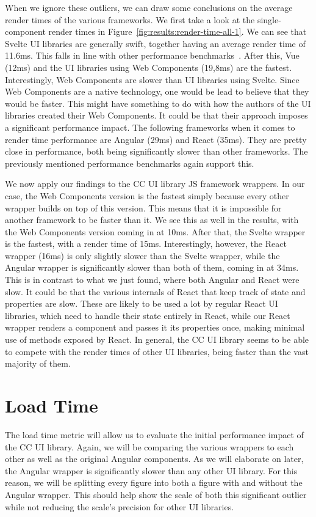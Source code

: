 When we ignore these outliers, we can draw some conclusions on the average render times of the various frameworks. We first take a look at the single-component render times in Figure~\ref{fig:results:render-time-all-1}. We can see that Svelte UI libraries are generally swift, together having an average render time of 11.6ms. This falls in line with other performance benchmarks~. After this, Vue (12ms) and the UI libraries using Web Components (19,8ms) are the fastest. Interestingly, Web Components are slower than UI libraries using Svelte. Since Web Components are a native technology, one would be lead to believe that they would be faster. This might have something to do with how the authors of the UI libraries created their Web Components. It could be that their approach imposes a significant performance impact. The following frameworks when it comes to render time performance are Angular (29ms) and React (35ms). They are pretty close in performance, both being significantly slower than other frameworks. The previously mentioned performance benchmarks again support this.

We now apply our findings to the CC UI library JS framework wrappers. In our case, the Web Components version is the fastest simply because every other wrapper builds on top of this version. This means that it is impossible for another framework to be faster than it. We see this as well in the results, with the Web Components version coming in at 10ms. After that, the Svelte wrapper is the fastest, with a render time of 15ms. Interestingly, however, the React wrapper (16ms) is only slightly slower than the Svelte wrapper, while the Angular wrapper is significantly slower than both of them, coming in at 34ms. This is in contrast to what we just found, where both Angular and React were slow. It could be that the various internals of React that keep track of state and properties are slow. These are likely to be used a lot by regular React UI libraries, which need to handle their state entirely in React, while our React wrapper renders a component and passes it its properties once, making minimal use of methods exposed by React. In general, the CC UI library seems to be able to compete with the render times of other UI libraries, being faster than the vast majority of them.

\section{Load Time}
The load time metric will allow us to evaluate the initial performance impact of the CC UI library. Again, we will be comparing the various wrappers to each other as well as the original Angular components. As we will elaborate on later, the Angular wrapper is significantly slower than any other UI library. For this reason, we will be splitting every figure into both a figure with and without the Angular wrapper. This should help show the scale of both this significant outlier while not reducing the scale's precision for other UI libraries.

